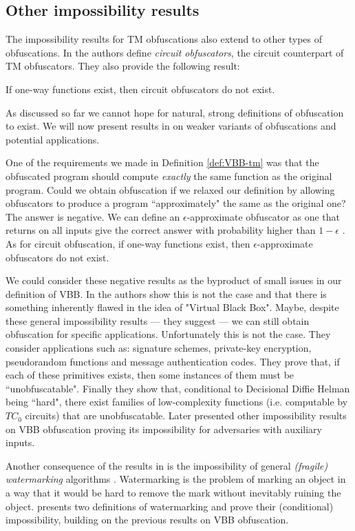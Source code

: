 \subsection{Other impossibility results}

The impossibility results for TM obfuscations also extend to other types of obfuscations.
In \cite{VBB-imp} the authors define \emph{circuit obfuscators}, the circuit counterpart of TM obfuscators. They also provide the following result:

\begin{mytheorem}
	If one-way functions exist, then circuit obfuscators do not exist.
\end{mytheorem}

As discussed so far we cannot hope for natural, strong definitions of obfuscation to exist. We will now present results in \cite{VBB-imp} on weaker variants of obfuscations and potential applications.

One of the requirements we made in Definition \ref{def:VBB-tm} was that the obfuscated program should compute \emph{exactly} the same function as the original program. Could we obtain obfuscation if we relaxed our definition by allowing obfuscators to produce a program ``approximately" the same as the original one?
The answer is negative. We can define an $\epsilon$-approximate obfuscator as one that returns on all inputs give the correct answer with probability higher than $1-\epsilon$ \cite{VBB-imp}. As for circuit obfuscation, if one-way functions exist, then $\epsilon$-approximate obfuscators do not exist.

We could consider these negative results as the byproduct of small issues in our definition of VBB. In \cite{VBB-imp} the authors show this is not the case and that there is something inherently flawed in the idea of "Virtual Black Box". Maybe, despite these general impossibility results --- they suggest --- we can still obtain obfuscation for specific applications. Unfortunately this is not the case. They consider applications such as: signature schemes, private-key encryption, pseudorandom functions and message authentication codes. They prove that, if each of these primitives exists, then some instances of them must be ``unobfuscatable".
Finally they show that, conditional to Decisional Diffie Helman being ``hard", there exist families of low-complexity functions (i.e. computable by $TC_0$ circuits) that are unobfuscatable.
Later \cite{VBB-imp-aux} presented other impossibility results on VBB obfuscation proving its impossibility for adversaries with auxiliary inputs.

Another consequence of the results in \cite{VBB-imp} is the impossibility of general \emph{(fragile) watermarking} algorithms \cite{collberg2002watermarking}. 
Watermarking is the problem of marking an object in a way that it would be hard to remove the mark without inevitably ruining the object. \cite{VBB-imp} presents two definitions of watermarking and prove their (conditional) impossibility, building on the previous results on VBB obfuscation.


